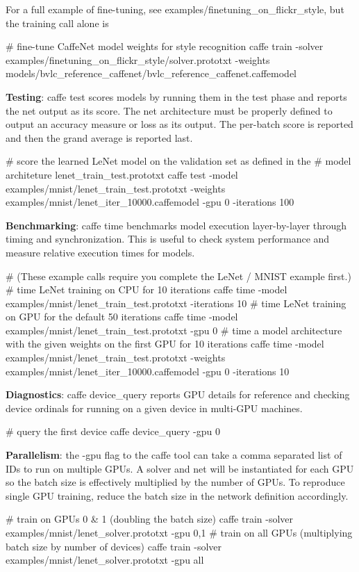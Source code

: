 For a full example of fine-\/tuning, see examples/finetuning\+\_\+on\+\_\+flickr\+\_\+style, but the training call alone is \begin{DoxyVerb}# fine-tune CaffeNet model weights for style recognition
caffe train -solver examples/finetuning_on_flickr_style/solver.prototxt -weights models/bvlc_reference_caffenet/bvlc_reference_caffenet.caffemodel
\end{DoxyVerb}


{\bfseries Testing}\+: {\ttfamily caffe test} scores models by running them in the test phase and reports the net output as its score. The net architecture must be properly defined to output an accuracy measure or loss as its output. The per-\/batch score is reported and then the grand average is reported last. \begin{DoxyVerb}# score the learned LeNet model on the validation set as defined in the
# model architeture lenet_train_test.prototxt
caffe test -model examples/mnist/lenet_train_test.prototxt -weights examples/mnist/lenet_iter_10000.caffemodel -gpu 0 -iterations 100
\end{DoxyVerb}


{\bfseries Benchmarking}\+: {\ttfamily caffe time} benchmarks model execution layer-\/by-\/layer through timing and synchronization. This is useful to check system performance and measure relative execution times for models. \begin{DoxyVerb}# (These example calls require you complete the LeNet / MNIST example first.)
# time LeNet training on CPU for 10 iterations
caffe time -model examples/mnist/lenet_train_test.prototxt -iterations 10
# time LeNet training on GPU for the default 50 iterations
caffe time -model examples/mnist/lenet_train_test.prototxt -gpu 0
# time a model architecture with the given weights on the first GPU for 10 iterations
caffe time -model examples/mnist/lenet_train_test.prototxt -weights examples/mnist/lenet_iter_10000.caffemodel -gpu 0 -iterations 10
\end{DoxyVerb}


{\bfseries Diagnostics}\+: {\ttfamily caffe device\+\_\+query} reports G\+PU details for reference and checking device ordinals for running on a given device in multi-\/\+G\+PU machines. \begin{DoxyVerb}# query the first device
caffe device_query -gpu 0
\end{DoxyVerb}


{\bfseries Parallelism}\+: the {\ttfamily -\/gpu} flag to the {\ttfamily caffe} tool can take a comma separated list of I\+Ds to run on multiple G\+P\+Us. A solver and net will be instantiated for each G\+PU so the batch size is effectively multiplied by the number of G\+P\+Us. To reproduce single G\+PU training, reduce the batch size in the network definition accordingly. \begin{DoxyVerb}# train on GPUs 0 & 1 (doubling the batch size)
caffe train -solver examples/mnist/lenet_solver.prototxt -gpu 0,1
# train on all GPUs (multiplying batch size by number of devices)
caffe train -solver examples/mnist/lenet_solver.prototxt -gpu all
\end{DoxyVerb}


